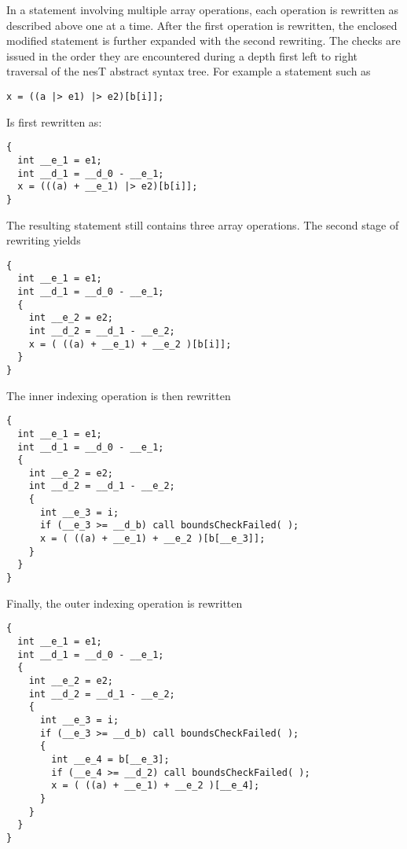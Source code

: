 In a statement involving multiple array operations, each operation is rewritten as described
above one at a time. After the first operation is rewritten, the enclosed modified statement is
further expanded with the second rewriting. The checks are issued in the order they are
encountered during a depth first left to right traversal of the nesT abstract syntax tree. For
example a statement such as

\singlespace
\begin{lstlisting}[language=nesC]
x = ((a |> e1) |> e2)[b[i]];
\end{lstlisting}
\primaryspacing

Is first rewritten as:

\singlespace
\begin{lstlisting}[language=nesC]
{
  int __e_1 = e1;
  int __d_1 = __d_0 - __e_1;
  x = (((a) + __e_1) |> e2)[b[i]];
}
\end{lstlisting}
\primaryspacing

The resulting statement still contains three array operations. The second stage of rewriting
yields

\singlespace
\begin{lstlisting}[language=nesC]
{
  int __e_1 = e1;
  int __d_1 = __d_0 - __e_1;
  {
    int __e_2 = e2;
    int __d_2 = __d_1 - __e_2;
    x = ( ((a) + __e_1) + __e_2 )[b[i]];
  }
}
\end{lstlisting}
\primaryspacing

The inner indexing operation is then rewritten

\singlespace
\begin{lstlisting}[language=nesC]
{
  int __e_1 = e1;
  int __d_1 = __d_0 - __e_1;
  {
    int __e_2 = e2;
    int __d_2 = __d_1 - __e_2;
    {
      int __e_3 = i;
      if (__e_3 >= __d_b) call boundsCheckFailed( );
      x = ( ((a) + __e_1) + __e_2 )[b[__e_3]];
    }
  }
}
\end{lstlisting}
\primaryspacing

Finally, the outer indexing operation is rewritten

\singlespace
\begin{lstlisting}[language=nesC]
{
  int __e_1 = e1;
  int __d_1 = __d_0 - __e_1;
  {
    int __e_2 = e2;
    int __d_2 = __d_1 - __e_2;
    {
      int __e_3 = i;
      if (__e_3 >= __d_b) call boundsCheckFailed( );
      {
        int __e_4 = b[__e_3];
        if (__e_4 >= __d_2) call boundsCheckFailed( );
        x = ( ((a) + __e_1) + __e_2 )[__e_4];
      }
    }
  }
}
\end{lstlisting}
\primaryspacing

